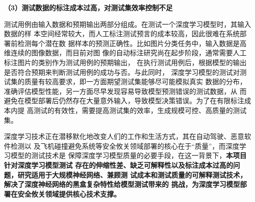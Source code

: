 \textbf{（3）测试数据的标注成本过高，对测试集效率控制不足}

测试用例由输入数据和预期输出两部分组成。在测试一个深度学习模型时，其输入数据的样
本空间经常较大，而人工标注测试预言的成本较高，因此很难在系统部署前检测每个潜在数
据样本的预测正确性。比如图片分类任务中，输入数据是高维连续的图像数据，而目前对图
像的自动标注研究尚在起步阶段，通常需要人工标注图片的类别作为测试用例的预期输出，
在执行测试用例后，根据模型的输出是否符合预期来判断测试用例的成功与否。与此同时，
深度学习模型的测试对测试集的质量有较高要求，即一方面期望测试集能够尽可能模拟真实
数据的分布，准确评估模型性能，另一方面尽早发现容易导致模型预测错误的测试数据，从
而避免在模型部署后仍然存在大量意外输入，导致模型决策错误。为了在有限标注成本内提
高测试的有效性，需要提高测试集的效率，生成规模可控、高质量的测试集。


深度学习技术正在潜移默化地改变人们的工作和生活方式，其在自动驾驶、恶意软件检测以
及飞机碰撞避免系统等安全攸关领域部署的核心在于“质量”，而深度学习模型的测试技术是
保障深度学习模型质量的必要手段，在这一背景下，\textbf{本项目针对深度学习模型测试
存在的伸缩性差、缺乏可解释性以及标注成本过高的问题，研究适用于大规模神经网络、兼顾测
试成本和测试质量的可解释测试技术，解决了深度神经网络的黑盒复杂特性给模型测试带来的
挑战，为深度学习模型部署在安全攸关领域提供核心技术支撑。}


